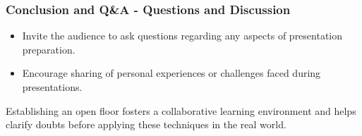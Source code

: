 \documentclass[aspectratio=169]{beamer}
\begin{document}
\begin{frame}[fragile]
    \frametitle{Conclusion and Q\&A - Questions and Discussion}
    \begin{itemize}
        \item Invite the audience to ask questions regarding any aspects of presentation preparation.
        \item Encourage sharing of personal experiences or challenges faced during presentations.
    \end{itemize}
    Establishing an open floor fosters a collaborative learning environment and helps clarify doubts before applying these techniques in the real world.
\end{frame}
\end{document}
